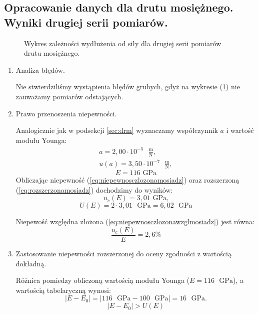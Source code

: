 \documentclass [a4paper,11pt]{article}
\begin{document}
	\subsection{Opracowanie danych dla drutu mosiężnego. Wyniki drugiej serii pomiarów.}
	
	\begin{figure}[!h]
		\centering

		\caption{Wykres zależności wydłużenia od siły dla drugiej serii pomiarów drutu mosiężnego.}
		\label{fig:wykmosiadz2}
	\end{figure}
	
	\begin{enumerate}[label=\alph*)]
		\item Analiza błędów.
		
		Nie stwierdziliśmy wystąpienia błędów grubych, gdyż na wykresie (\ref{fig:wykmosiadz2}) nie zauważamy pomiarów odstających.
		
		\item Prawo przenoszenia niepewności.
		
		Analogicznie jak w podsekcji \ref{sec:drm} wyznaczamy współczynnik $a$ i wartość modułu Younga:
		\begin{align}
		a = 2,00 \cdot 10^{-5} \text{ }\mathrm{\frac{m}{N}},\label{a} \\
		u(a) = 3,50 \cdot 10^{-7} \text{ }\mathrm{\frac{m}{N}},
		\end{align}
		$$ E = 116 \text{ GPa} $$
		Obliczając niepewność (\ref{eq:niepewnosczlozonamosiadz}) oraz rozszerzoną (\ref{eq:rozszerzonamosiadz}) dochodzimy do wyników: 
		$$ u_c(E) = 3,01 \text{ GPa,} $$
		$$ U(E) = 2 \cdot 3,01 \text{ }\mathrm{GPa} = 6,02 \text{ }\mathrm{GPa} $$
		
		Niepewość względna złożona (\ref{eq:niepewnosczlozonawzglmosiadz}) jest równa:
		$$ \frac{u_c(E)}{E} = 2,6\% $$
		
		\item Zastosowanie niepewności rozszerzonej do oceny zgodności z wartością dokładną.
		
		Różnica pomiedzy obliczoną wartością modułu Younga ($E=116  \text{ }\mathrm{GPa}$), a wartością tabelaryczną wynosi:
		\begin{equation}
		\label{eq:roznicamosiadz2}
		|E - E_0| = \left|116 \text{ }\mathrm{GPa} - 100 \text{ }\mathrm{GPa}\right| = 16 \text{ }\mathrm{GPa}.
		\end{equation}
		$$
		|E - E_0| > U(E)
		$$
		
		
	\end{enumerate}
\end{document}
